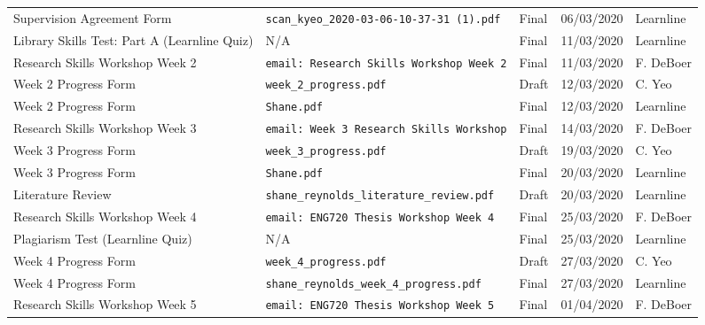 \documentclass[10pt, landscape]{article}
\begin{document}
\begin{longtable}{p{7cm}p{10cm}p{1.5cm}p{2cm}p{2cm}}
	Supervision Agreement Form						& \verb|scan_kyeo_2020-03-06-10-37-31 (1).pdf|								& Final				& 06/03/2020			& Learnline\\
	
	Library Skills Test: Part A (Learnline Quiz)	& N/A																		& Final 			& 11/03/2020		 	& Learnline\\
	
	Research Skills Workshop Week 2					& \verb|email: Research Skills Workshop Week 2|								& Final				& 11/03/2020		 	& F. DeBoer\\
	
	Week 2 Progress Form							& \verb|week_2_progress.pdf|												& Draft				& 12/03/2020			& C. Yeo\\
	
	Week 2 Progress Form							& \verb|Shane.pdf|															& Final				& 12/03/2020			& Learnline\\
	
	Research Skills Workshop Week 3					& \verb|email: Week 3 Research Skills Workshop|								& Final				& 14/03/2020		 	& F. DeBoer\\
	
	Week 3 Progress Form							& \verb|week_3_progress.pdf|												& Draft				& 19/03/2020			& C. Yeo\\
		
	Week 3 Progress Form							& \verb|Shane.pdf|															& Final				& 20/03/2020			& Learnline\\
	
	Literature Review 								& \verb|shane_reynolds_literature_review.pdf|								& Draft 			& 20/03/2020		 	& Learnline\\
	
	Research Skills Workshop Week 4					& \verb|email: ENG720 Thesis Workshop Week 4|								& Final				& 25/03/2020		 	& F. DeBoer\\
	
	Plagiarism Test (Learnline Quiz)				& N/A																		& Final 			& 25/03/2020		 	& Learnline\\
	
	Week 4 Progress Form							& \verb|week_4_progress.pdf|												& Draft				& 27/03/2020			& C. Yeo\\
			
	Week 4 Progress Form							& \verb|shane_reynolds_week_4_progress.pdf|												& Final				& 27/03/2020			& Learnline\\
	
	Research Skills Workshop Week 5					& \verb|email: ENG720 Thesis Workshop Week 5|								& Final				& 01/04/2020		 	& F. DeBoer\\
	

\end{longtable}
\end{document}
